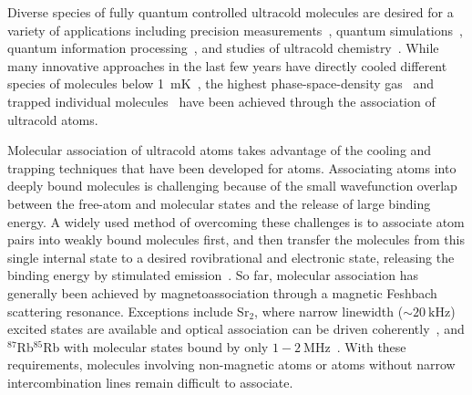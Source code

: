 \documentclass[aps,prl,twocolumn,10pt,superscriptaddress]{revtex4-1}
\begin{document}
Diverse species of fully quantum controlled  ultracold molecules are desired
for a variety of applications including precision measurements~\cite{
  Kondov2019,Nick_and_Ivan2017, PhysRevA.101.042504, Andreev2018,
  PhysRevLett.119.153001, hudson2011},
quantum simulations~\cite{Micheli2006, Yao2018, Wall2015, wall2015realizing},
quantum information processing~\cite{DeMille2002, Ni2018, Hudson2018, Lin2019},
and studies of ultracold chemistry~\cite{Bala2016,Hu1111,Segev2019,deJongh626}.
While many innovative approaches in the last few years
have directly cooled different species of %
molecules
below 1~mK~\cite{Norrgard2016,Prehn2016,Truppe2017,Anderegg2018,  PhysRevX.10.021049,
  Mitra1366},
the highest phase-space-density gas~\cite{Demarco2018} and
trapped individual molecules~\cite{Zhang2020,He331}
have been achieved through the association of ultracold atoms.

Molecular association of ultracold atoms takes advantage of the cooling and trapping techniques
that have been developed for atoms.
Associating atoms into deeply bound molecules is challenging
because of the small wavefunction overlap between the free-atom and molecular states
and the release of large binding energy.
A widely used method of overcoming these challenges is to associate atom pairs
into weakly bound molecules first,
and then transfer the molecules from this single internal state
to a desired rovibrational and electronic state,
releasing the binding energy by stimulated emission~\cite{Danzl2008, Ni2008, Lang2008,
  Takekoshi2014, Molony2014, Park2015, Guo2016, Kondov2019, Voges2020}.
So far, molecular association has generally been achieved by magnetoassociation
through a magnetic Feshbach scattering resonance.
Exceptions include Sr$_2$, where narrow linewidth ($\sim 20~\mathrm{kHz}$) excited states
are available and optical association can be driven coherently~\cite{Stellmer2012,Reinaudi2012},
and $^{87}$Rb$^{85}$Rb with molecular states bound by only $1-2~\mathrm{MHz}$~\cite{He331}.
With these requirements, molecules involving non-magnetic atoms
or atoms without narrow intercombination lines remain difficult to associate.
\end{document}
